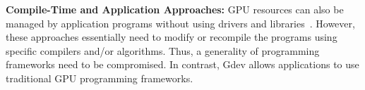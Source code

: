\textbf{Compile-Time and Application Approaches:}
GPU resources can also be managed by application
programs without using drivers and
libraries~\cite{Chen_IPDPS10,Guevara09,Saba_RTSS11}.
However, these approaches essentially need to modify or recompile the
programs using specific compilers and/or algorithms.
Thus, a generality of programming frameworks need to be compromised.
In contrast, Gdev allows applications to use traditional GPU programming
frameworks.

